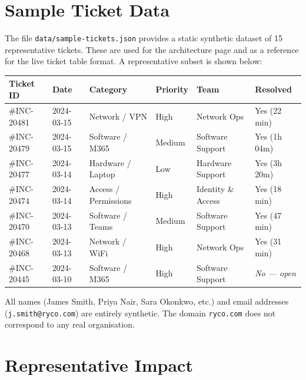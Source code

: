 \documentclass[12pt, a4paper]{article}
\newcommand{\inlinecode}[1]{%
  \colorbox{inlinecode!20}{\texttt{\small #1}}%
}
\begin{document}
\section{Sample Ticket Data}

The file \inlinecode{data/sample-tickets.json} provides a static synthetic dataset
of 15 representative tickets. These are used for the architecture page and as a reference
for the live ticket table format. A representative subset is shown below:

\begin{center}
\begin{tabular}{llllll}
\toprule
\textbf{Ticket ID} & \textbf{Date} & \textbf{Category} & \textbf{Priority} & \textbf{Team} & \textbf{Resolved} \\
\midrule
\#INC-20481 & 2024-03-15 & Network / VPN & High & Network Ops & Yes (22 min) \\
\#INC-20479 & 2024-03-15 & Software / M365 & Medium & Software Support & Yes (1h 04m) \\
\#INC-20477 & 2024-03-14 & Hardware / Laptop & Low & Hardware Support & Yes (3h 20m) \\
\#INC-20474 & 2024-03-14 & Access / Permissions & High & Identity \& Access & Yes (18 min) \\
\#INC-20470 & 2024-03-13 & Software / Teams & Medium & Software Support & Yes (47 min) \\
\#INC-20468 & 2024-03-13 & Network / WiFi & High & Network Ops & Yes (31 min) \\
\#INC-20445 & 2024-03-10 & Software / M365 & High & Software Support & \textit{No — open} \\
\bottomrule
\end{tabular}
\end{center}

All names (James Smith, Priya Nair, Sara Okonkwo, etc.) and email addresses
(\texttt{j.smith@ryco.com}) are entirely synthetic. The domain \texttt{ryco.com} does
not correspond to any real organisation.

\section{Representative Impact}
\end{document}
